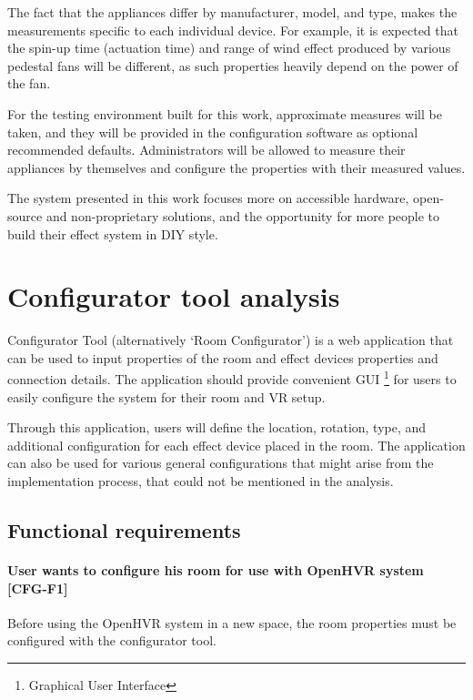 The fact that the appliances differ by manufacturer, model, and type,
makes the measurements specific to each individual device.
For example, it is expected that the spin-up time
(actuation time) and range of wind effect produced by various pedestal fans
will be different, as such properties heavily depend on the power of the fan.

\pagebreak

For the testing environment built for this work, approximate measures will be
taken, and they will be provided in the configuration software as optional
recommended defaults. Administrators will be allowed
to measure their appliances by themselves and configure the properties with
their measured values.


The system presented in this work focuses more
on accessible hardware, open-source and non-proprietary solutions, and
the opportunity for more people to build their effect system in DIY style.


\hypertarget{x-configurator-tool-analysis}{\section{Configurator tool analysis}}
Configurator Tool (alternatively `Room Configurator') is a web application that
can be used to input properties of the room and effect devices properties and
connection details.
The application should provide convenient GUI \footnote{Graphical User Interface}
for users to easily configure the system for their room and VR setup.


Through this application, users will define the location, rotation, type, and
additional configuration for each effect device placed in the room. The application
can also be used for various general configurations that might arise from
the implementation process, that could not be mentioned in the analysis.


\subsection{Functional requirements}
\hypertarget{x-\textbf{user-wants-to-configure-his-room-for-use-with-openhvr-system}-[cfg-f1]}{\paragraph*{\textbf{User wants to configure his room for use with OpenHVR system} [CFG-F1]}}
Before using the OpenHVR system in a new space,
the room properties must be configured with the configurator tool.


